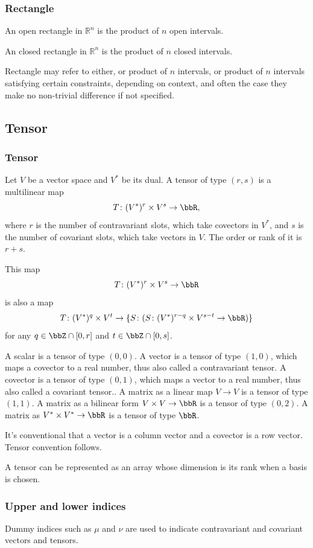 \documentclass[a4paper,12pt]{report}
\begin{document}
\subsubsection{Rectangle}
An open rectangle in $\mathbb{R}^n$ is the product of $n$ open intervals.

An closed rectangle in $\mathbb{R}^n$ is the product of $n$ closed intervals.

Rectangle may refer to either, or product of $n$ intervals, or product of $n$ intervals satisfying certain constraints, depending on context, and often the case they make no non-trivial difference if not specified.
\subsection{Tensor}
\subsubsection{Tensor}
Let $V$ be a vector space and $V^*$ be its dual. A tensor of type $(r,s)$ is a multilinear map
\[T\colon (V^*)^r\times V^s\to\bbR,\]
where $r$ is the number of contravariant slots, which take covectors in $V^*$, and $s$ is the number of covariant slots, which take vectors in $V$. The order or rank of it is $r+s$.

This map
\[T\colon (V^*)^r\times V^s\to\bbR\]
is also a map
\[T\colon (V^*)^q\times V^t\to\{S\colon (S\colon(V^*)^{r-q}\times V^{s-t}\to\bbR)\}\]
for any $q\in\bbZ\cap[0,r]$ and $t\in\bbZ\cap[0,s]$.

A scalar is a tensor of type $(0,0)$. A vector is a tensor of type $(1,0)$, which maps a covector to a real number, thus also called a contravariant tensor. A covector is a tensor of type $(0,1)$, which maps a vector to a real number, thus also called a covariant tensor.. A matrix as a linear map $V\to V$ is a tensor of type $(1,1)$. A matrix as a bilinear form $V\times V\to\bbR$ is a tensor of type $(0,2)$. A matrix as $V^*\times V^*\to\bbR$ is a tensor of type $\bbR$.

It's conventional that a vector is a column vector and a covector is a row vector. Tensor convention follows.

A tensor can be represented as an array whose dimension is its rank when a basis is chosen.
\subsubsection{Upper and lower indices}
Dummy indices such as $\mu$ and $\nu$ are used to indicate contravariant and covariant vectors and tensors.
\end{document}
